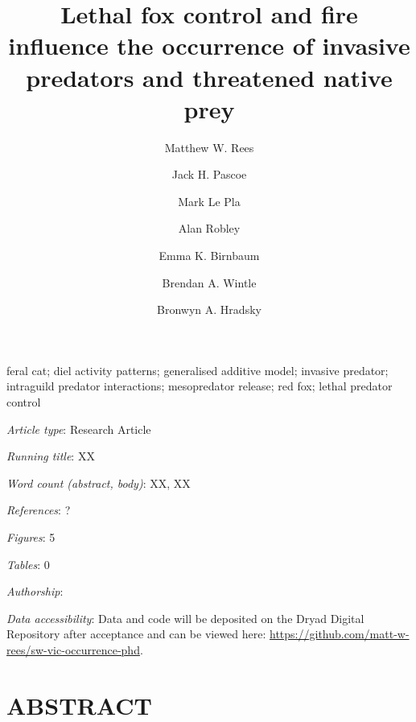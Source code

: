\documentclass[]{elsarticle} %
\begin{document}
\begin{frontmatter}

  \title{Lethal fox control and fire influence the occurrence of invasive predators and threatened native prey}
    \author[UOM]{Matthew W. Rees}
    \author[CEC]{Jack H. Pascoe}
  
    \author[CEC]{Mark Le Pla}
  
    \author[ARI]{Alan Robley}
  
    \author[CEC]{Emma K. Birnbaum}
  
    \author[UOM]{Brendan A. Wintle}
  
    \author[UOM]{Bronwyn A. Hradsky}
  
      \address[UOM]{Quantitative \& Applied Ecology Group, School of Ecosystem and Forest Science, The University of Melbourne, Parkville, VIC, Australia}
    \address[CEC]{Conservation Ecology Centre, Otway Lighthouse Rd, Cape Otway, VIC, Australia}
    \address[ARI]{Department of Environment, Land, Water and Planning, Arthur Rylah Institute for Environmental Research, Heidelberg, Australia}
  
  \begin{abstract}
  
  \end{abstract}
   \begin{keyword} feral cat; diel activity patterns; generalised additive model; invasive predator; intraguild predator interactions; mesopredator release; red fox; lethal predator control\end{keyword}
 \end{frontmatter}

\parskip=12pt

\emph{Article type}: Research Article

\emph{Running title}: XX

\emph{Word count (abstract, body)}: XX, XX

\emph{References}: ?

\emph{Figures}: 5

\emph{Tables}: 0

\emph{Authorship}:

\emph{Data accessibility}: Data and code will be deposited on the Dryad Digital Repository after acceptance and can be viewed here: \url{https://github.com/matt-w-rees/sw-vic-occurrence-phd}.

\newpage

\hypertarget{abstract}{%
\section*{ABSTRACT}\label{abstract}}
\end{document}
